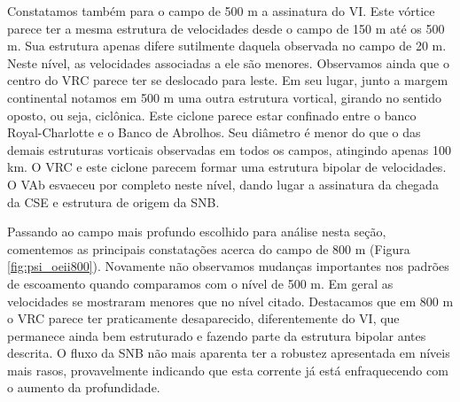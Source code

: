 Constatamos também para o campo de 500 m a assinatura do VI. Este vórtice parece
ter a mesma estrutura de velocidades desde o campo de 150 m até os 500 m. Sua estrutura apenas difere sutilmente
daquela observada no campo de 20 m. Neste nível, as velocidades associadas a ele são menores.  
Observamos ainda que o centro do VRC parece ter se deslocado para leste. 
Em seu lugar, junto a margem continental notamos em 500 m 
uma outra estrutura vortical, girando no sentido oposto, ou seja, ciclônica. Este ciclone
parece estar confinado entre o banco Royal-Charlotte e o Banco de Abrolhos. Seu diâmetro é menor
do que o das demais estruturas vorticais observadas em todos os campos, atingindo apenas 100 km. O VRC 
e este ciclone parecem formar uma estrutura bipolar de velocidades. O VAb esvaeceu por completo neste nível,
dando lugar a assinatura da chegada da CSE e estrutura de origem da SNB. 
 
Passando ao campo mais profundo escolhido para análise nesta seção, comentemos as principais
constatações acerca do campo de 800 m (Figura \ref{fig:psi_oeii800}). Novamente não observamos mudanças importantes
nos padrões de escoamento quando comparamos com o nível de 500 m. Em geral as velocidades se mostraram 
menores que no nível citado. Destacamos que em 800 m o VRC parece ter praticamente desaparecido, 
diferentemente do VI, que permanece ainda bem estruturado e fazendo parte da estrutura bipolar antes descrita. 
O fluxo da SNB não mais aparenta ter a robustez apresentada em níveis mais rasos, provavelmente indicando que 
esta corrente já está enfraquecendo com o aumento da profundidade. 

